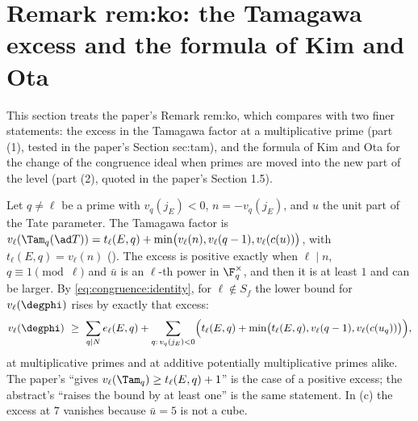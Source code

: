 \section[Remark rem:ko: Tamagawa excess; Kim and Ota]{Remark rem:ko: the Tamagawa excess and the formula of Kim and Ota}\label{sec:congruence:rem-ko}

This section treats the paper's Remark rem:ko, which compares  with two finer statements: the excess in the Tamagawa factor at a multiplicative prime
(part (1), tested in the paper's Section sec:tam), and the formula of Kim and Ota for the change of the congruence ideal when primes are moved into the new part of the
level (part (2), quoted in the paper's Section 1.5).

\begin{remark}\label{rem:congruence:rem-ko-1}
Let $q\ne\ell$ be a prime with $v_q(j_E)<0$, $n=-v_q(j_E)$, and $u$ the unit part of the Tate parameter. The Tamagawa factor is
$v_\ell(\Tam_q(\ad T))=t_\ell(E,q)+\min\bigl(v_\ell(n),v_\ell(q-1),v_\ell(c(u))\bigr)$, with $t_\ell(E,q)=v_\ell(n)$ (). The excess is positive exactly when $\ell\mid n$, $q\equiv1\pmod\ell$ and $\bar u$ is an
$\ell$-th power in $\F_q^\times$, and then it is at least $1$ and can be larger. By \eqref{eq:congruence:identity}, for $\ell\notin S_f$ the lower bound for $v_\ell(\degphi)$ rises by exactly that excess:
\[
v_\ell(\degphi)\ \ge\ \sum_{q\mid N}e_\ell(E,q)+\sum_{q:\,v_q(j_E)<0}\Bigl(t_\ell(E,q)+\min\bigl(t_\ell(E,q),v_\ell(q-1),v_\ell(c(u_q))\bigr)\Bigr),
\]
at multiplicative primes and at additive potentially multiplicative primes alike. The paper's ``gives $v_\ell(\Tam_q)\ge t_\ell(E,q)+1$'' is the case of a positive excess; the abstract's
``raises the bound by at least one'' is the same statement. In (c) the excess at $7$ vanishes because $\bar u=5$ is not a cube.
\end{remark}

